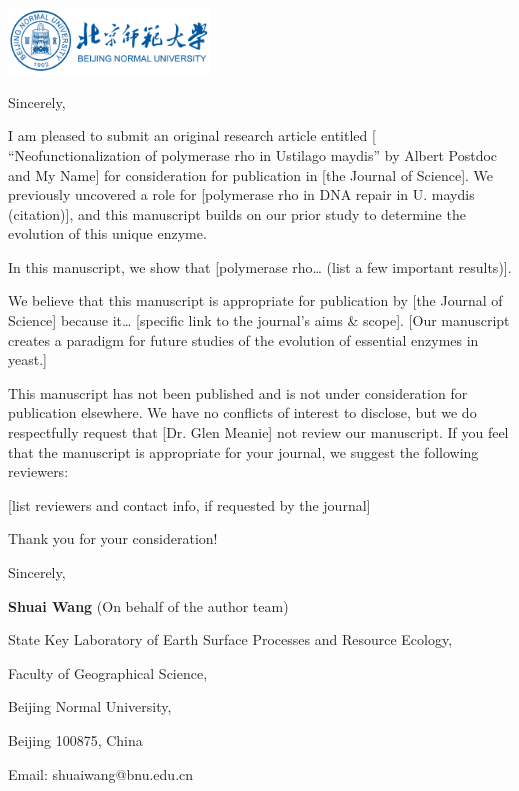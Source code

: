\documentclass[11pt,a4paper,roman]{moderncv}
\begin{document}
\begin{minipage}[t]{\textwidth}
\includegraphics[width=0.40\textwidth]{bnu}
\end{minipage}


\opening{\vspace*{-2em}}
\closing{Sincerely,}{\vspace*{-2em}}
\makelettertitle

I am pleased to submit an original research article entitled [ “Neofunctionalization of polymerase rho in Ustilago maydis” by Albert Postdoc and My Name] for consideration for publication in [the Journal of Science].  We previously uncovered a role for [polymerase rho in DNA repair in U. maydis (citation)], and this manuscript builds on our prior study to determine the evolution of this unique enzyme.

In this manuscript, we show that [polymerase rho… (list a few important results)].

We believe that this manuscript is appropriate for publication by [the Journal of Science] because it… [specific link to the journal’s aims \& scope].  [Our manuscript creates a paradigm for future studies of the evolution of essential enzymes in yeast.]

This manuscript has not been published and is not under consideration for publication elsewhere.  We have no conflicts of interest to disclose, but we do respectfully request that [Dr. Glen Meanie] not review our manuscript.  If you feel that the manuscript is appropriate for your journal, we suggest the following reviewers:

[list reviewers and contact info, if requested by the journal]

\vspace{0.5cm}

Thank you for your consideration!

\vspace{0.5cm}

Sincerely, 

\textbf{Shuai Wang} (On behalf of the author team)


State Key Laboratory of Earth Surface Processes and Resource Ecology,

Faculty of Geographical Science,

Beijing Normal University,

Beijing 100875, China

Email: shuaiwang@bnu.edu.cn
\end{document}
